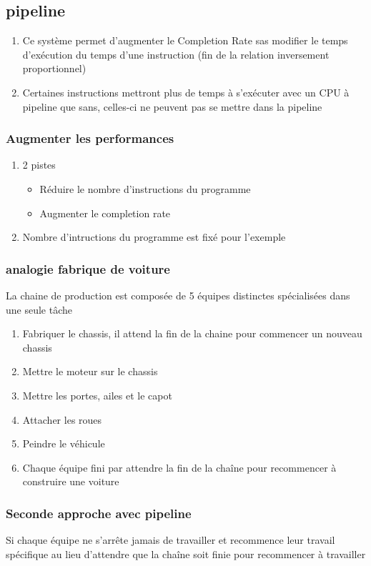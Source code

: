 \subsection{pipeline}
\begin{enumerate}
  \item Ce système permet d'augmenter le Completion Rate sas modifier le temps d'exécution du temps d'une instruction (fin de la relation inversement proportionnel)
  \item Certaines instructions mettront plus de temps à s'exécuter avec un CPU à pipeline que sans, celles-ci ne peuvent pas se mettre dans la pipeline
\end{enumerate}

\subsubsection{Augmenter les performances}
\begin{enumerate}
\item 2 pistes
\begin{itemize}
\item Réduire le nombre d'instructions du programme
\item Augmenter le completion rate
\end{itemize}
\item Nombre d'intructions du programme est fixé pour l'exemple
\end{enumerate}

\subsubsection{analogie fabrique de voiture}
La chaine de production est composée de 5 équipes distinctes spécialisées dans une seule tâche
\begin{enumerate}
  \item Fabriquer le chassis, il attend la fin de la chaine pour commencer un nouveau chassis
  \item Mettre le moteur sur le chassis
  \item Mettre les portes, ailes et le capot
  \item Attacher les roues
  \item Peindre le véhicule
  \item Chaque équipe fini par attendre la fin de la chaîne pour recommencer à construire une voiture
\end{enumerate}

\subsubsection{Seconde approche avec pipeline}
Si chaque équipe ne s'arrête jamais de travailler et recommence leur travail spécifique au lieu d'attendre que la chaîne soit finie pour recommencer à travailler

